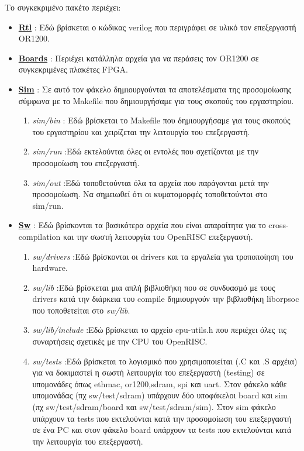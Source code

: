 \documentclass[a4paper,10pt]{article}
\numberwithin{figure}{section}
\numberwithin{table}{section}
\begin{document}
Το συγκεκριμένο πακέτο περιέχει:
\begin{itemize}
 \item \underline{{\bf Rtl}} : Εδώ βρίσκεται ο κώδικας verilog που περιγράφει σε υλικό τον επεξεργαστή OR1200.
\item \underline{{\bf Boards}} : Περιέχει κατάλληλα αρχεία για να περάσεις τον OR1200 σε συγκεκριμένες πλακέτες
FPGA.
\item \underline{{\bf Sim}} : Σε αυτό τον φάκελο δημιουργούνται τα αποτελέσματα της προσομοίωσης σύμφωνα με
το Makefile που δημιουργήσαμε για τους σκοπούς του εργαστηρίου. \begin{enumerate}
                                                                 \item \emph{sim/bin} : Εδώ βρίσκεται το Makefile που δημιουργήσαμε για τους σκοπούς του
εργαστηρίου και χειρίζεται την λειτουργία του επεξεργαστή.
                                                                 \item \emph{sim/run} :Εδώ εκτελούνται όλες οι εντολές που σχετίζονται με την προσομοίωση
του επεξεργαστή.
                                                                 \item \emph{sim/out} :Εδώ τοποθετούνται όλα τα αρχεία που παράγονται μετά την προσομοίωση.
Να σημειωθεί ότι οι κυματομορφές τοποθετούνται στο sim/run.
                                                                \end{enumerate}

\item \underline{{\bf Sw}} : Εδώ βρίσκονται τα βασικότερα αρχεία που είναι απαραίτητα για το cross-compilation 
και την σωστή λειτουργία του OpenRISC επεξεργαστή.
					  \begin{enumerate}
                                           \item \emph{sw/drivers} :Εδώ βρίσκονται οι drivers και τα εργαλεία για τροποποίηση του hardware.
					   \item \emph{sw/lib} :Eδώ βρίσκεται μια απλή βιβλιοθήκη που σε συνδυασμό με τους drivers κατά την διάρκεια του compile δημιουργούν την βιβλιοθήκη liborpsoc 
που τοποθετείται στο \emph{sw/lib}.
					   \item \emph{sw/lib/include} :Εδώ βρίσκεται το αρχείο cpu-utils.h που περιέχει όλες τις συναρτήσεις σχετικές
με την CPU του OpenRISC.
					   \item \emph{sw/tests} :Εδώ βρίσκεται το λογισμικό που χρησιμοποιείται (.C και .S αρχέια) για να δοκιμαστεί η σωστή λειτουργία
του επεξεργαστή (testing) σε υπομονάδες όπως ethmac, or1200,sdram, spi και uart. Στον φάκελο κάθε υπομονάδας (πχ sw/test/sdram) υπάρχουν δύο υποφάκελοι board 
και sim (πχ sw/test/sdram/board και sw/test/sdram/sim). Στον sim φάκελο υπάρχουν τα tests που εκτελούνται κατά την προσομοίωση του επεξεργαστή σε ένα PC και στον
φάκελο board υπάρχουν τα tests που εκτελούνται κατά την λειτουργία του επεξεργαστή.
                                          \end{enumerate}


\end{itemize}
\end{document}
